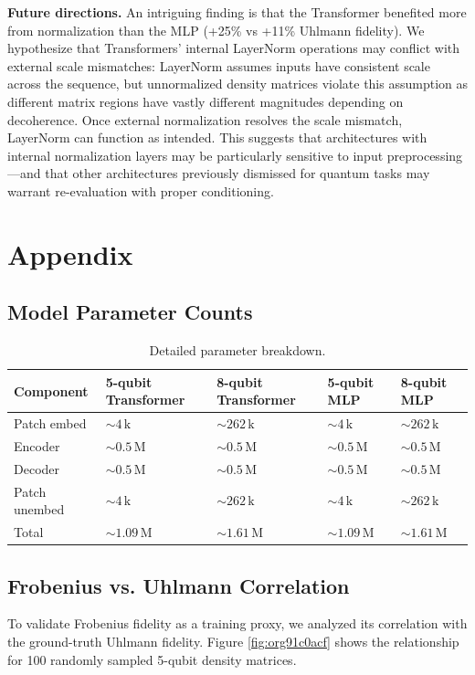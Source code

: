 \documentclass[11pt]{article}
\begin{document}
\textbf{Future directions.} An intriguing finding is that the Transformer benefited more from normalization than the MLP (+25\% vs +11\% Uhlmann fidelity). We hypothesize that Transformers' internal LayerNorm operations may conflict with external scale mismatches: LayerNorm assumes inputs have consistent scale across the sequence, but unnormalized density matrices violate this assumption as different matrix regions have vastly different magnitudes depending on decoherence. Once external normalization resolves the scale mismatch, LayerNorm can function as intended. This suggests that architectures with internal normalization layers may be particularly sensitive to input preprocessing---and that other architectures previously dismissed for quantum tasks may warrant re-evaluation with proper conditioning.
\section{Appendix}
\label{sec:orgd0b24ac}

\subsection{Model Parameter Counts}
\label{sec:org9e3a0b5}
\begin{table}[htbp]
\caption{\label{tab:org8408dfd}Detailed parameter breakdown.}
\centering
\begin{tabular}{lllll}
Component & 5-qubit Transformer & 8-qubit Transformer & 5-qubit MLP & 8-qubit MLP\\
\hline
Patch embed & \(\sim 4\,\mathrm{k}\) & \(\sim 262\,\mathrm{k}\) & \(\sim 4\,\mathrm{k}\) & \(\sim 262\,\mathrm{k}\)\\
Encoder & \(\sim 0.5\,\mathrm{M}\) & \(\sim 0.5\,\mathrm{M}\) & \(\sim 0.5\,\mathrm{M}\) & \(\sim 0.5\,\mathrm{M}\)\\
Decoder & \(\sim 0.5\,\mathrm{M}\) & \(\sim 0.5\,\mathrm{M}\) & \(\sim 0.5\,\mathrm{M}\) & \(\sim 0.5\,\mathrm{M}\)\\
Patch unembed & \(\sim 4\,\mathrm{k}\) & \(\sim 262\,\mathrm{k}\) & \(\sim 4\,\mathrm{k}\) & \(\sim 262\,\mathrm{k}\)\\
Total & \(\sim 1.09\,\mathrm{M}\) & \(\sim 1.61\,\mathrm{M}\) & \(\sim 1.09\,\mathrm{M}\) & \(\sim 1.61\,\mathrm{M}\)\\
\end{tabular}
\end{table}
\subsection{Frobenius vs. Uhlmann Correlation}
\label{sec:org595d850}
To validate Frobenius fidelity as a training proxy, we analyzed its correlation with the ground-truth Uhlmann fidelity. Figure \ref{fig:org91c0acf} shows the relationship for 100 randomly sampled 5-qubit density matrices.
\end{document}
